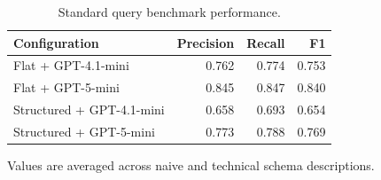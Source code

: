 \begin{table}[htbp]
\centering
\small
\caption{Standard query benchmark performance.}
\label{tab:standard-query-results}
\begin{tabular}{lrrr}
\toprule
Configuration & Precision & Recall & F1 \\
\midrule
Flat + GPT-4.1-mini & 0.762 & 0.774 & 0.753 \\
Flat + GPT-5-mini & 0.845 & 0.847 & 0.840 \\
Structured + GPT-4.1-mini & 0.658 & 0.693 & 0.654 \\
Structured + GPT-5-mini & 0.773 & 0.788 & 0.769 \\
\bottomrule
\end{tabular}
\par\footnotesize{Values are averaged across naive and technical schema descriptions.}
\end{table}
